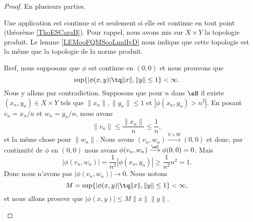 \begin{proof}
    En plusieurs parties.
    \begin{subproof}
        \spitem[\ref{ITEMooWMFBooOWPzgP} \( \Rightarrow\) \ref{ITEMooSFQZooHNcWwH}]
        Une application est continue si et seulement si elle est continue en tout point (théorème \ref{ThoESCaraB}).
        \spitem[\ref{ITEMooSFQZooHNcWwH} \( \Rightarrow\) \ref{ITEMooWSWQooSYzOol}]
        Pour rappel, nous avons mis sur \( X\times Y\) la topologie produit. Le lemme \ref{LEMooFQMSooLmdIvD} nous indique que cette topologie est la même que la topologie de la norme produit.

        Bref, nous supposons que \( \phi\) est continue en \( (0,0)\) et nous prouvons que
        \begin{equation}
            \sup\{ | \phi(x,y) |\tq \| x \|, \| y \|\leq 1 \}<\infty.
        \end{equation}
        Nous y allons par contradiction. Supposons que pour \( n\) dans \( \eN\) il existe \( (x_n,y_n)\in X\times Y\) tels que \( \| x_n \|, \| y_n \|\leq 1\)  et \( | \phi(x_n,y_n)>n^2 |\). En posant \( v_n=x_n/n\) et \( w_n=y_n/n\), nous avons
        \begin{equation}
            \| v_n \|\leq \frac{ \| x_n \| }{ n }\leq \frac{1}{ n },
        \end{equation}
        et la même chose pour \( \| w_n \|\). Nous avons \( (v_n,w_n)\stackrel{V\times W}{\longrightarrow}(0,0)\) et donc, par continuité de \( \phi\) en \( (0,0)\) nous avons \( \phi(v_n,w_n)\stackrel{\eC}{\longrightarrow}\phi(0,0)=0\). Mais
        \begin{equation}
            | \phi(v_n,w_n) |=\frac{1}{ n^2 }| \phi(x_n,y_n) |\geq \frac{1}{ n^2 }n^2=1.
        \end{equation}
        Donc nous n'avons pas \( | \phi(v_n,w_n) |\to 0\).
        \spitem[\ref{ITEMooWSWQooSYzOol} \( \Rightarrow\) \ref{ITEMooRKHQooMVXlYD}]
        Nous notons
        \begin{equation}
            M=   \sup\{ | \phi(x,y) |\tq \| x \|, \| y \|\leq 1 \}<\infty,
        \end{equation}
        et nous allons prouver que \( | \phi(x,y) |\leq M\| x \|\| y \|\).


\end{subproof}
\end{proof}
